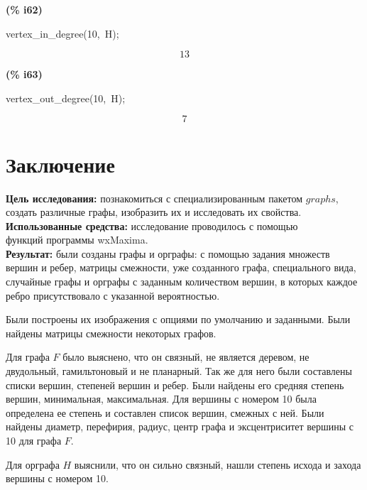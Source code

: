 \documentclass[fleqn]{article}
\begin{document}
\noindent
\begin{minipage}[t]{4.000000em}\color{red}\bfseries
(\% i62)	
\end{minipage}
\begin{minipage}[t]{\textwidth}\color{blue}
vertex\_in\_degree(10,\ H);
\end{minipage}
\[\displaystyle \tag{\% o62} 
13\mbox{}
\]


\noindent
\begin{minipage}[t]{4.000000em}\color{red}\bfseries
(\% i63)	
\end{minipage}
\begin{minipage}[t]{\textwidth}\color{blue}
vertex\_out\_degree(10,\ H);
\end{minipage}
\[\displaystyle \tag{\% o63} 
7\mbox{}
\]

\newpage
\section*{Заключение}

\textbf{Цель исследования: } познакомиться с специализированным пакетом $graphs$, создать различные графы, изобразить их и исследовать их свойства. \\

\textbf{Использованные средства: }исследование проводилось с помощью\\ функций программы wxMaxima.\\

\textbf{Результат: } были созданы графы и орграфы: с помощью задания множеств вершин и ребер, матрицы смежности, уже созданного графа, специального вида, случайные графы и орграфы с заданным количеством вершин, в которых каждое ребро присутствовало с указанной вероятностью.

Были построены их изображения с опциями по умолчанию и заданными. Были найдены матрицы смежности некоторых графов.

Для графа $F$ было выяснено, что он связный, не является деревом, не двудольный, гамильтоновый и не планарный. Так же для него были составлены списки вершин, степеней вершин и ребер. Были найдены его средняя степень вершин, минимальная, максимальная. Для вершины с номером 10 была определена ее степень и составлен список вершин, смежных с ней. Были найдены диаметр, перефирия, радиус, центр графа и эксцентриситет вершины с 10 для графа $F$.

Для орграфа $H$ выяснили, что он сильно связный, нашли степень исхода и захода вершины с номером 10.
\end{document}
